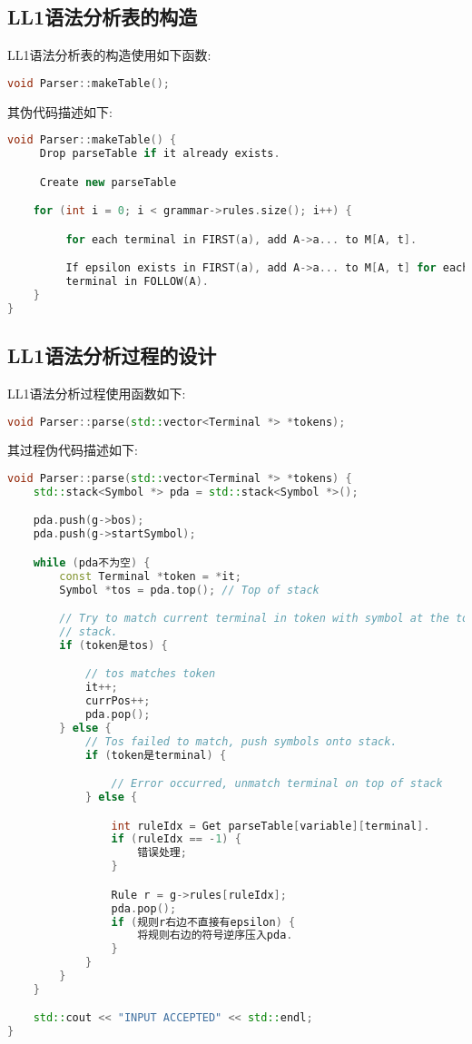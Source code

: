 \subsection{LL1语法分析表的构造}
LL1语法分析表的构造使用如下函数:

\begin{lstlisting}[language=c++]
void Parser::makeTable();
\end{lstlisting}
其伪代码描述如下:
\begin{lstlisting}[language=c++]
void Parser::makeTable() {
     Drop parseTable if it already exists.

     Create new parseTable

    for (int i = 0; i < grammar->rules.size(); i++) {

         for each terminal in FIRST(a), add A->a... to M[A, t].

         If epsilon exists in FIRST(a), add A->a... to M[A, t] for each
         terminal in FOLLOW(A).
    }
}
\end{lstlisting}

\subsection{LL1语法分析过程的设计}
LL1语法分析过程使用函数如下:
\begin{lstlisting}[language=c++]
void Parser::parse(std::vector<Terminal *> *tokens);
\end{lstlisting}
其过程伪代码描述如下:
\begin{lstlisting}[language=c++]
void Parser::parse(std::vector<Terminal *> *tokens) {
    std::stack<Symbol *> pda = std::stack<Symbol *>();

    pda.push(g->bos);
    pda.push(g->startSymbol);

    while (pda不为空) {
        const Terminal *token = *it;
        Symbol *tos = pda.top(); // Top of stack

        // Try to match current terminal in token with symbol at the top of
        // stack.
        if (token是tos) {

            // tos matches token
            it++;
            currPos++;
            pda.pop();
        } else {
            // Tos failed to match, push symbols onto stack.
            if (token是terminal) {

                // Error occurred, unmatch terminal on top of stack
            } else {

                int ruleIdx = Get parseTable[variable][terminal].
                if (ruleIdx == -1) {
                    错误处理;
                }

                Rule r = g->rules[ruleIdx];
                pda.pop();
                if (规则r右边不直接有epsilon) {
                    将规则右边的符号逆序压入pda.
                }
            }
        }
    }

    std::cout << "INPUT ACCEPTED" << std::endl;
}
\end{lstlisting}

